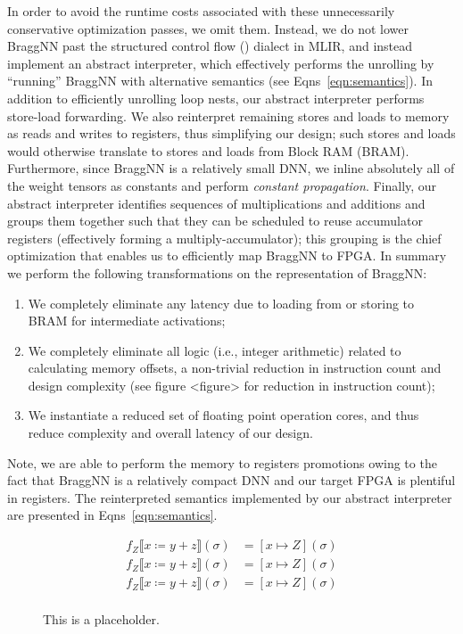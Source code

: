 In order to avoid the runtime costs associated with these unnecessarily conservative optimization passes, we omit them.
Instead, we do not lower BraggNN past the structured control flow () dialect in MLIR, and instead implement an abstract interpreter, which effectively performs the unrolling by ``running'' BraggNN with alternative semantics (see Eqns~\eqref{eqn:semantics}).
In addition to efficiently unrolling loop nests, our abstract interpreter performs store-load forwarding.
We also reinterpret remaining stores and loads to memory as reads and writes to registers, thus simplifying our design; such stores and loads would otherwise translate to stores and loads from Block RAM (BRAM).
Furthermore, since BraggNN is a relatively small DNN, we inline absolutely all of the weight tensors as constants and perform \emph{constant propagation}.
Finally, our abstract interpreter identifies sequences of multiplications and additions and groups them together such that they can be scheduled to reuse accumulator registers (effectively forming a multiply-accumulator); this grouping is the chief optimization that enables us to efficiently map BraggNN to FPGA.
In summary we perform the following transformations on the  representation of BraggNN:
\begin{enumerate}
	\item We completely eliminate any latency due to loading from or storing to BRAM for intermediate activations;
	\item We completely eliminate all logic (i.e., integer arithmetic) related to calculating memory offsets, a non-trivial reduction in instruction count and design complexity (see figure <figure> for reduction in instruction count);
	\item We instantiate a reduced set of floating point operation cores, and thus reduce complexity and overall latency of our design.
\end{enumerate}
Note, we are able to perform the memory to registers promotions owing to the fact that BraggNN is a relatively compact DNN and our target FPGA is plentiful in registers.
The reinterpreted semantics implemented by our abstract interpreter are presented in Eqns~\eqref{eqn:semantics}.

\begin{figure}
	\begin{equation}\label{eqn:semantics}
		\begin{split}
			f_{Z} \llbracket x \coloneqq y + z\rrbracket (\sigma) &= [ x \mapsto Z ] (\sigma) \\
			f_{Z} \llbracket x \coloneqq y + z\rrbracket (\sigma) &= [ x \mapsto Z ] (\sigma) \\
			f_{Z} \llbracket x \coloneqq y + z\rrbracket (\sigma) &= [ x \mapsto Z ] (\sigma) \\
		\end{split}
	\end{equation}
	\caption{This is a placeholder.}\label{fig:semantics}
\end{figure}

